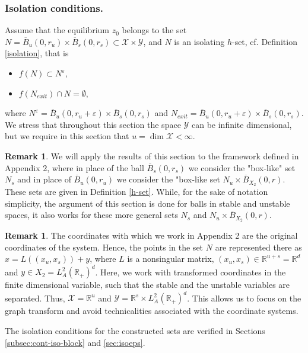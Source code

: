 \documentclass[11pt, leqno]{amsart}
\theoremstyle{definition}
\newtheorem{rem}[thm]{Remark}
\def\R{\mathbb{R}}
\begin{document}
\subsubsection{Isolation conditions.} Assume that the equilibrium $z_0$ belongs to the set $N=\overline{B}_u(0,r_u) \times \overline{B}_s(0,r_s)  \subset \mathcal{X} \times \mathcal{Y}$,
and $N$ is an isolating $h$-set, cf. Definition \ref{isolation}, that is 
\begin{itemize}
	\item[(1)] $f(N) \subset N^\varepsilon$,
	\item[(2)] $f(N_{exit})\cap N = \emptyset,$
\end{itemize}
where $N^\varepsilon = \overline{B}_u(0,r_u+\varepsilon) \times \overline{B}_s(0,r_s)$ and $N_{exit} = \overline{B}_u(0,r_u+\varepsilon) \times \overline{B}_s(0,r_s)$. We stress that throughout this section the space $\mathcal{Y}$ can be infinite dimensional, but we require in this section that $u=\dim \mathcal{X} < \infty$.

\begin{rem}
	We will apply the results of this section to the framework defined in Appendix 2, where in place of the ball $\overline{B}_s(0,r_s)$ we consider the "box-like" set $N_s$ and in place of $\overline{B}_u(0,r_u)$ we consider the "box-like set $N_u \times \overline{B}_{X_2}(0,r)$. These sets are given in Definition \ref{h-set}. While, for the sake of notation simplicity, the argument of this section is done for balls in stable and unstable spaces, it also works for these more general sets $N_s$ and $N_u \times \overline{B}_{X_2}(0,r)$.   
\end{rem}

\begin{rem}
	The coordinates with which we work in Appendix 2 are the original coordinates of the system. Hence, the points in the set $N$ are represented there as $x=L((x_u,x_s))+y$, where $L$ is a nonsingular matrix, $(x_u,x_s) \in \R^{u+s} = \R^d$ and $y\in X_2=L^2_A(\R_+)^d$.  Here, we work with transformed coordinates in the finite dimensional variable, such that the stable and the unstable variables are separated. Thus, $\mathcal{X}=\R^u$ and $\mathcal{Y}=\R^s\times L^2_A(\R_+)^d$. This allows us to focus on the graph transform and avoid technicalities associated with the coordinate systems. 
\end{rem}
	
The isolation conditions for the constructed sets are verified in Sections \ref{subsec:cont-iso-block} and \ref{sec:isoeps}.  
\end{document}
